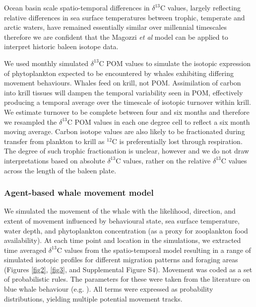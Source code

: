 \documentclass[a4paper,12pt]{article}
\begin{document}
Ocean basin scale spatio-temporal differences in $\delta^{13}$C values, largely reflecting relative differences in sea surface temperatures between trophic, temperate and arctic waters, have remained essentially similar over millennial timescales \cite{schmittner2016complementary} therefore we are confident that the Magozzi \textit{et al} \cite{magozzi2017using} model can be applied to interpret historic baleen isotope data.

We used monthly simulated $\delta^{13}$C POM values to simulate the isotopic expression of phytoplankton expected to be encountered by whales exhibiting differing movement behaviours.
Whales feed on krill, not POM. 
Assimilation of carbon into krill tissues will dampen the temporal variability seen in POM, effectively producing a temporal average over the timescale of isotopic turnover within krill. 
We estimate turnover to be complete between four and six months and therefore we resampled the $\delta^{13}$C POM values in each one degree cell to reflect a six month moving average. 
Carbon isotope values are also likely to be fractionated during transfer from plankton to krill as $^{12}$C  is preferentially lost through respiration. 
The degree of such trophic fractionation is unclear, however and we do not draw interpretations based on absolute $\delta^{13}$C values, rather on the relative $\delta^{13}$C values across the length of the baleen plate.

\subsubsection{Agent-based whale movement model}
We simulated the movement of the whale with the likelihood, direction, and extent of movement influenced by behavioural state, sea surface temperature, water depth, and phytoplankton concentration (as a proxy for zooplankton food availability). 
At each time point and location in the simulations, we extracted time averaged $\delta^{13}$C values from the spatio-temporal model \cite{magozzi2017using} resulting in a range of simulated isotopic profiles for different migration patterns and foraging areas (Figures \ref{fig2}, \ref{fig3}, and Supplemental Figure S4). 
Movement was coded as a set of probabilistic rules. 
The parameters for these were taken from the literature on blue whale behaviour (e.g. \cite{handbook}). 
All terms were expressed as probability distributions, yielding multiple potential movement tracks. 
 
\end{document}
